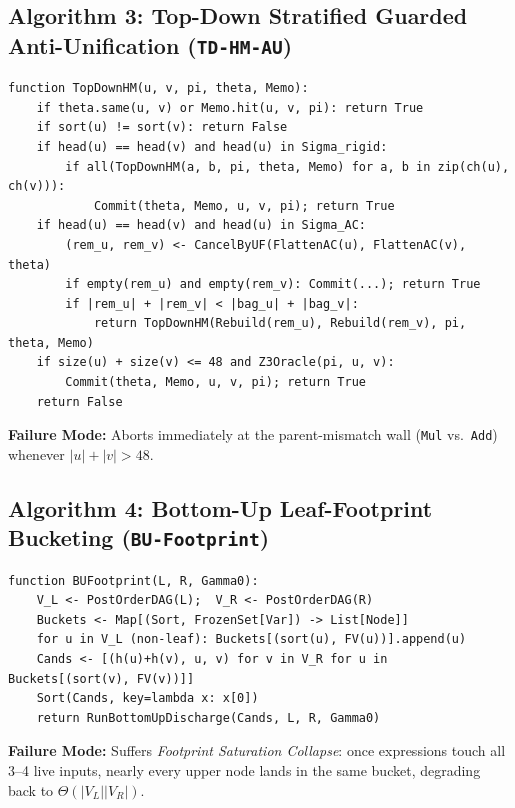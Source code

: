 \documentclass[11pt,a4paper]{article}
\begin{document}
\subsection{Algorithm 3: Top-Down Stratified Guarded Anti-Unification (\texttt{TD-HM-AU})}
\begin{lstlisting}[caption={Algorithm 3: Top-Down Stratified Guarded Anti-Unification (\texttt{TD-HM-AU}).}]
function TopDownHM(u, v, pi, theta, Memo):
    if theta.same(u, v) or Memo.hit(u, v, pi): return True
    if sort(u) != sort(v): return False
    if head(u) == head(v) and head(u) in Sigma_rigid:
        if all(TopDownHM(a, b, pi, theta, Memo) for a, b in zip(ch(u), ch(v))):
            Commit(theta, Memo, u, v, pi); return True
    if head(u) == head(v) and head(u) in Sigma_AC:
        (rem_u, rem_v) <- CancelByUF(FlattenAC(u), FlattenAC(v), theta)
        if empty(rem_u) and empty(rem_v): Commit(...); return True
        if |rem_u| + |rem_v| < |bag_u| + |bag_v|:
            return TopDownHM(Rebuild(rem_u), Rebuild(rem_v), pi, theta, Memo)
    if size(u) + size(v) <= 48 and Z3Oracle(pi, u, v):
        Commit(theta, Memo, u, v, pi); return True
    return False
\end{lstlisting}
\textbf{Failure Mode:} Aborts immediately at the parent-mismatch wall (\texttt{Mul} vs.\ \texttt{Add}) whenever $|u|+|v| > 48$.

\subsection{Algorithm 4: Bottom-Up Leaf-Footprint Bucketing (\texttt{BU-Footprint})}
\begin{lstlisting}[caption={Algorithm 4: Bottom-Up Leaf-Footprint Bucketing (\texttt{BU-Footprint}).}]
function BUFootprint(L, R, Gamma0):
    V_L <- PostOrderDAG(L);  V_R <- PostOrderDAG(R)
    Buckets <- Map[(Sort, FrozenSet[Var]) -> List[Node]]
    for u in V_L (non-leaf): Buckets[(sort(u), FV(u))].append(u)
    Cands <- [(h(u)+h(v), u, v) for v in V_R for u in Buckets[(sort(v), FV(v))]]
    Sort(Cands, key=lambda x: x[0])
    return RunBottomUpDischarge(Cands, L, R, Gamma0)
\end{lstlisting}
\textbf{Failure Mode:} Suffers \emph{Footprint Saturation Collapse}: once expressions touch all 3--4 live inputs, nearly every upper node lands in the same bucket, degrading back to $\Theta(|V_L||V_R|)$.
\end{document}
